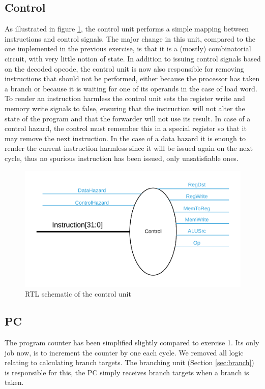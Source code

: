 \subsection{Control}
As illustrated in figure \ref{fig:control}, the control unit performs a simple mapping between instructions and control signals.
The major change in this unit, compared to the one implemented in the previous exercise, is that it is a (mostly) combinatorial circuit, with very little notion of state.
In addition to issuing control signals based on the decoded opcode, the control unit is now also responsible for removing instructions that should not be performed, either because the processor has taken a branch or because it is waiting for one of its operands in the case of load word.
To render an instruction harmless the control unit sets the register write and memory write signals to false, ensuring that the instruction will not alter the state of the program and that the forwarder will not use its result.
In case of a control hazard, the control must remember this in a special register so that it may remove the next instruction. 
In the case of a data hazard it is enough to render the current instruction harmless since it will be issued again on the next cycle, thus no spurious instruction has been issued, only unsatisfiable ones.

\begin{figure}[h!]
    \includegraphics[width=\linewidth]{img/Control.png}
    \caption{RTL schematic of the control unit}
    \label{fig:control}
\end{figure}

\subsection{PC}
The program counter has been simplified slightly compared to exercise 1.
Its only job now, is to increment the counter by one each cycle.
We removed all logic relating to calculating branch targets.
The branching unit (Section \ref{sec:branch}) is responsible for this, the PC simply receives branch targets when a branch is taken.

